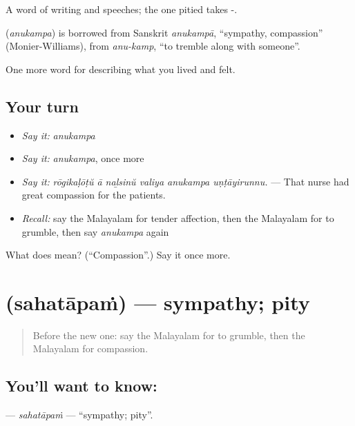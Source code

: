 A word of writing and speeches; the one pitied takes -.

\begin{cousinweb}
\textbf{} (\emph{anukampa}) is borrowed from Sanskrit \emph{anukampā}, \textquotedblleft{}sympathy, compassion\textquotedblright{} (Monier-Williams), from \emph{anu-kamp}, \textquotedblleft{}to tremble along with someone\textquotedblright{}.
\end{cousinweb}

\begin{grammarlens}[title={What you've built}]
One more word for describing what you lived and felt.
\end{grammarlens}

\subsection*{Your turn}
\begin{itemize}
\raggedright
  \item \emph{Say it:} \emph{anukampa}
  \item \emph{Say it:} \emph{anukampa}, once more
  \item \emph{Say it:} \emph{rōgikaḷōṭŭ ā naḻsinŭ valiya anukampa uṇṭāyirunnu.} — That nurse had great compassion for the patients.
  \item \emph{Recall:} say the Malayalam for tender affection, then the Malayalam for to grumble, then say \emph{anukampa} again
\end{itemize}

\begin{tcolorbox}[breakable,colback=teal!4,colframe=teal!35!black,title={Before you move on}]
What does  mean? (\textquotedblleft{}Compassion\textquotedblright{}.) Say it once more.
\end{tcolorbox}
\section[\texorpdfstring{\ml{സഹതാപം} (sahatāpaṁ)}{സഹതാപം (sahatāpaṁ)}]{ (sahatāpaṁ) — sympathy; pity}

\label{lesson:ML-C520-sahatapam}



\begin{quote}
Before the new one: say the Malayalam for to grumble, then the Malayalam for compassion.
\end{quote}

\subsection*{You'll want to know: }
\textbf{} — \emph{sahatāpaṁ} — \textquotedblleft{}sympathy; pity\textquotedblright{}.

